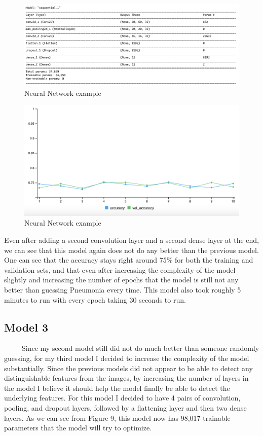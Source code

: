 \documentclass[12pt]{article}
\begin{document}
\begin{figure}

{\centering \includegraphics[width=0.75\linewidth,height=0.25\textheight]{images/model2} 

}

\caption{Neural Network example}\label{fig:sample-fig7}
\end{figure}

\begin{figure}

{\centering \includegraphics[width=0.75\linewidth,height=0.25\textheight]{images/model2out} 

}

\caption{Neural Network example}\label{fig:sample-fig8}
\end{figure}

Even after adding a second convolution layer and a second dense layer at
the end, we can see that this model again does not do any better than
the previous model. One can see that the accuracy stays right around
75\% for both the training and validation sets, and that even after
increasing the complexity of the model slightly and increasing the
number of epochs that the model is still not any better than guessing
Pneumonia every time. This model also took roughly 5 minutes to run with
every epoch taking 30 seconds to run.

\hypertarget{model-3}{%
\subsection{Model 3}\label{model-3}}

~~~~~Since my second model still did not do much better than someone
randomly guessing, for my third model I decided to increase the
complexity of the model substantially. Since the previous models did not
appear to be able to detect any distinguishable features from the
images, by increasing the number of layers in the model I believe it
should help the model finally be able to detect the underlying features.
For this model I decided to have 4 pairs of convolution, pooling, and
dropout layers, followed by a flattening layer and then two dense
layers. As we can see from Figure 9, this model now has 98,017 trainable
parameters that the model will try to optimize.
\end{document}

